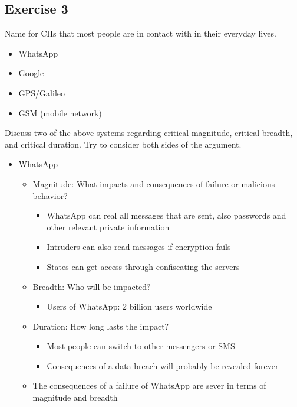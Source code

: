\documentclass{article}
\begin{document}
\subsection{Exercise 3}
Name for CIIs that most people are in contact with in their everyday lives.
\begin{itemize}
    \item WhatsApp
    \item Google
    \item GPS/Galileo
    \item GSM (mobile network)
\end{itemize}
Discuss two of the above systems regarding critical magnitude, critical breadth, and critical duration. Try to consider both sides of the argument.\\
\begin{itemize}
    \item WhatsApp
          \begin{itemize}
              \item Magnitude: What impacts and consequences of failure or malicious behavior?
                    \begin{itemize}
                        \item WhatsApp can real all messages that are sent, also passwords and other relevant private information
                        \item Intruders can also read messages if encryption fails
                        \item States can get access through confiscating the servers
                    \end{itemize}
              \item Breadth: Who will be impacted?
                    \begin{itemize}
                        \item Users of WhatsApp: 2 billion users worldwide
                    \end{itemize}
              \item Duration: How long lasts the impact?
                    \begin{itemize}
                        \item Most people can switch to other messengers or SMS
                        \item Consequences of a data breach will probably be revealed forever
                    \end{itemize}
              \item The consequences of a failure of WhatsApp are sever in terms of magnitude and breadth

\end{itemize}
\end{itemize}
\end{document}
